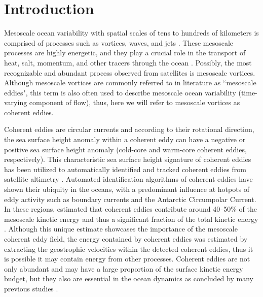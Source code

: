 \documentclass[draft,linenumbers]{agujournal2019}
\begin{document}
	
\section{Introduction}

Mesoscale ocean variability with spatial scales of tens to hundreds of kilometers is comprised of processes such as vortices, waves, and jets \citep{Ferrari_energy_2009, Fu_Eddy_2010}. 
These mesoscale processes are highly energetic, and they play a crucial role in the transport of heat, salt, momentum, and other tracers through the ocean \citep{Wunsch_energetics_2004, Wyrtki_Eddy_1976, Gill_Energy_1974}. Possibly, the most recognizable and abundant process observed from satellites is mesoscale vortices. Although mesoscale vortices are commonly referred to in literature as ``mesoscale eddies", this term is also often used to describe mesoscale ocean variability (time-varying component of flow), thus, here we will refer to mesoscale vortices as coherent eddies. 


Coherent eddies are circular currents and according to their rotational direction, the sea surface height anomaly within a coherent eddy can have a negative or positive sea surface height anomaly (cold-core and warm-core coherent eddies, respectively). 
This characteristic sea surface height signature of coherent eddies has been utilized to automatically identified and tracked coherent eddies from satellite altimetry \citep{Cui_eddy_identification_2020,Martinez_Kinetic_2019, Ashkezari_eddies_2016, Faghmous_A_2015,Chelton_Global_2007}. 
Automated identification algorithms of coherent eddies have shown their ubiquity in the oceans, with a predominant influence at hotpots of eddy activity such as boundary currents and the Antarctic Circumpolar Current. In these regions, \citet{Chelton_The_2011} estimated that coherent eddies contribute around 40--50\% of the mesoscale kinetic energy \citep{Chelton_The_2011} and thus a significant fraction of the total kinetic energy \citep{Ferrari_energy_2009}. Although this unique estimate showcases the importance of the mesoscale coherent eddy field, the energy contained by coherent eddies was estimated by extracting the geostrophic velocities within the detected coherent eddies, thus it is possible it may contain energy from other processes. Coherent eddies are not only abundant and may have a large proportion of the surface kinetic energy budget, but they also are essential in the ocean dynamics as concluded by many previous studies \citep{Patel_SO_eddies_2020,Schubert_submesoscale_2019,Pilo_eddy_2015,Frenger_Southern_2015,Frenger_Imprint_2013,BeronVera_Agulhas_2013,Siegel_Bio_2011,Hogg_Interdecadal_2006}.
\end{document}
